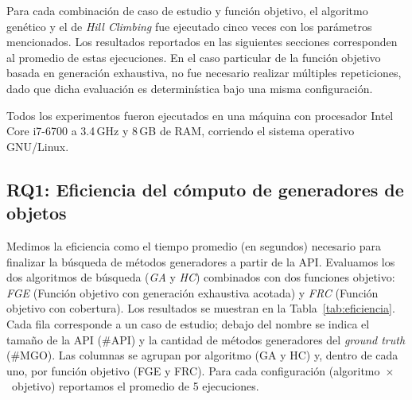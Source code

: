 Para cada combinación de caso de estudio y función objetivo, el algoritmo
genético y el de \emph{Hill Climbing} fue ejecutado cinco veces con los parámetros mencionados. Los
resultados reportados en las siguientes secciones corresponden al promedio de
estas ejecuciones. En el caso particular de la función objetivo basada en
generación exhaustiva, no fue necesario realizar múltiples repeticiones, dado
que dicha evaluación es determinística bajo una misma configuración.

Todos los experimentos fueron ejecutados en una máquina con procesador Intel
Core i7-6700 a 3.4\,GHz y 8\,GB de RAM, corriendo el sistema operativo
GNU/Linux.


%

\subsection{RQ1: Eficiencia del cómputo de generadores de objetos}
Medimos la eficiencia como el tiempo promedio (en segundos) necesario para
finalizar la búsqueda de métodos generadores a partir de la API. Evaluamos los dos
algoritmos de búsqueda (\emph{GA} y \emph{HC}) combinados con dos funciones
objetivo: \emph{FGE} (Función objetivo con generación exhaustiva acotada) y \emph{FRC} (Función objetivo con cobertura). 
Los resultados se muestran en la Tabla~\ref{tab:eficiencia}. Cada fila
corresponde a un caso de estudio; debajo del nombre se indica el tamaño de la API
(\#API) y la cantidad de métodos generadores del \emph{ground truth}
(\#MGO). Las columnas se agrupan por algoritmo (GA y HC) y, dentro de
cada uno, por función objetivo (FGE y FRC). Para cada configuración
(algoritmo~$\times$~objetivo) reportamos el promedio de 5 ejecuciones.

